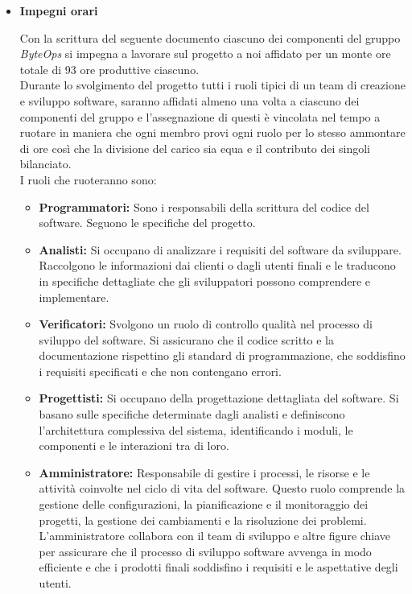 \documentclass{article}
\begin{document}
\begin{itemize}
    \item[] \textbf{\fontsize{12}{6}\selectfont Impegni orari}
    
    Con la scrittura del seguente documento ciascuno dei componenti del gruppo \textit{ByteOps} si impegna a lavorare sul progetto a noi affidato per un monte ore totale di 93 ore produttive ciascuno. \\
    Durante lo svolgimento del progetto tutti i ruoli tipici di un team di creazione e sviluppo software, saranno affidati almeno una volta a ciascuno dei componenti del gruppo e  l’assegnazione di questi è vincolata nel tempo a ruotare in maniera che ogni membro provi ogni ruolo per lo stesso ammontare di ore così che la divisione del carico sia equa e il contributo dei singoli bilanciato. \\
    I ruoli che ruoteranno sono: 
    \begin{itemize}
        \item \textbf{Programmatori:} Sono i responsabili della scrittura del codice del software. Seguono le specifiche del progetto. 
        
        \item \textbf{Analisti:} Si occupano di analizzare i requisiti del software da sviluppare. Raccolgono le informazioni dai clienti o dagli utenti finali e le traducono in specifiche dettagliate che gli sviluppatori possono comprendere e implementare. 
        
        \item \textbf{Verificatori:} Svolgono un ruolo di controllo qualità nel processo di sviluppo del software. Si assicurano che il codice scritto e la documentazione rispettino gli standard di programmazione, che soddisfino i requisiti specificati e che non contengano errori. 
        
        \item \textbf{Progettisti:} Si occupano della progettazione dettagliata del software. Si basano sulle specifiche determinate dagli analisti e definiscono l'architettura complessiva del sistema, identificando i moduli, le componenti e le interazioni tra di loro.  

        \item \textbf{Amministratore:} Responsabile di gestire i processi, le risorse e le attività coinvolte nel ciclo di vita del software. Questo ruolo comprende la gestione delle configurazioni, la pianificazione e il monitoraggio dei progetti, la gestione dei cambiamenti e la risoluzione dei problemi. L'amministratore collabora con il team di sviluppo e altre figure chiave per assicurare che il processo di sviluppo software avvenga in modo efficiente e che i prodotti finali soddisfino i requisiti e le aspettative degli utenti.
        

\end{itemize}
\end{itemize}
\end{document}
